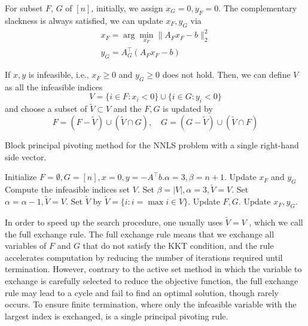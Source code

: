 \documentclass[conference,onecolumn,12pt]{IEEEtran}
\numberwithin{equation}{section}
\numberwithin{figure}{section}
\numberwithin{table}{section}
\theoremstyle{definition}
\begin{document}
For subset $F$, $G$ of $[n]$, initially, we assign $x_G=0,y_F=0$. The complementary slackness is always satisfied, we can update $x_F,y_G$ via
\begin{subequations}
	\begin{align}
		x_F=\arg\min_{x_F}\|A_Fx_F-b\|_2^2\\
		y_G=A_G^\top (A_Fx_F-b)
	\end{align}
\end{subequations}

If $x,y$ is infeasible, i.e., $x_F\geq 0$ and $y_G\geq 0$ does not hold. Then, we can define $V$ as all the infeasible indices
\begin{equation}
	V=\{i\in F:x_i<0\}\cup\{i\in G:y_i<0\} 
\end{equation}
and choose a subset of $\tilde{V}\subset V$ and the $F,G$ is updated by
\begin{equation}
	F=(F-\tilde{V})\cup (\tilde{V}\cap G),\quad G=(G-\tilde{V})\cup (\tilde{V}\cap F)
\end{equation}
\begin{algorithm}
	\caption{Block principal pivoting method for the NNLS problem with a single right-hand side vector.} 
	\begin{algorithmic}[1]
		\State Initialize $F=\emptyset,G=[n],x=0,y=-A^\top b.\alpha=3,\beta=n+1$.
		\State Update $x_F$ and $y_G$
		\State Compute the infeasible indices set $V$.
		\State Set $\beta=|V|,\alpha=3,\tilde{V}=V$.
		\State Set $\alpha=\alpha-1,\tilde{V}=V$.
		\State Set $\tilde{V}$ by $\tilde{V}=\{i:i=\max{i \in V}\}$.
		\EndIf
		\State Update $F,G$. Update $x_F,y_G$.
		\EndWhile
	\end{algorithmic} 
	\label{alg:pgd}
\end{algorithm}

In order to speed up the search procedure, one usually uses $\tilde{V} = V$ , which we call
the full exchange rule. The full exchange rule means that we exchange all variables of
$F$ and $G$ that do not satisfy the KKT condition, and the rule accelerates computation by reducing the
number of iterations required until termination. However, contrary to the active set method in which the variable to exchange is carefully selected to reduce the objective function, the full exchange rule may lead to a cycle and fail to find an optimal solution, though rarely occurs. To ensure finite termination, where only the infeasible variable with the largest index is exchanged,
is a single principal pivoting rule.
\end{document}

